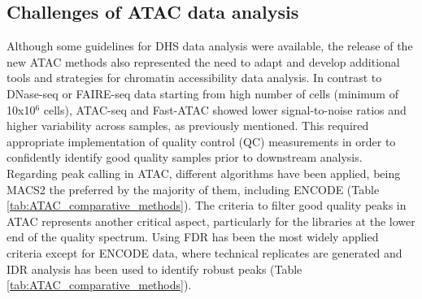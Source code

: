 \subsection{Challenges of ATAC data analysis}  
Although some guidelines for DHS data analysis were available, the release of the new ATAC methods also represented the need to adapt and develop additional tools and strategies for chromatin accessibility data analysis. In contrast to DNase-seq or FAIRE-seq data starting from high number of cells (minimum of 10x10$^6$ cells), ATAC-seq and Fast-ATAC showed lower signal-to-noise ratios and higher variability across samples, as previously mentioned. This required appropriate implementation of quality control (QC) measurements in order to confidently identify good quality samples prior to downstream analysis. Regarding peak calling in ATAC, different algorithms have been applied, being MACS2 the preferred by the majority of them, including ENCODE (Table \ref{tab:ATAC_comparative_methods}). The criteria to filter good quality peaks in ATAC represents another critical aspect, particularly for the libraries at the lower end of the quality spectrum. Using FDR has been the most widely applied criteria except for ENCODE data, where technical replicates are generated and IDR analysis has been used to identify robust peaks (Table \ref{tab:ATAC_comparative_methods}). 


